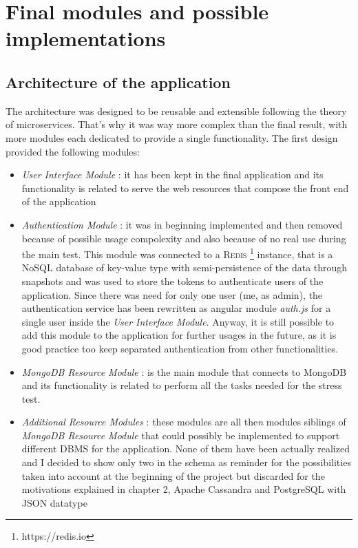 \section{Final modules and possible implementations}
\label{sec:5}

\subsection{Architecture of the application}
The architecture was designed to be reusable and extensible following the theory of microservices. That’s why it was way more complex than the final result, with more modules each dedicated to provide a single functionality. The first design provided the following modules:
\begin{itemize}
	\item \textit{User Interface Module} : it has been kept in the final application and its functionality is related to serve the web resources that compose the front end of the application
	\item \textit{Authentication Module} : it was in beginning implemented and then removed because of possible usage compolexity and also because of no real use during the main test. This module was connected to a \textsc{Redis} \footnote{https://redis.io} instance, that is a NoSQL database of key-value type with semi-persistence of the data through snapshots and was used to store the tokens to authenticate users of the application. Since there was need for only one user (me, as admin), the authentication service has been rewritten as angular module \textit{auth.js} for a single user inside the \textit{User Interface Module}. Anyway, it is still possible to add this module to the application for further usages in the future, as it is good practice too keep separated authentication from other functionalities.
	\item \textit{MongoDB Resource Module} : is the main module that connects to MongoDB and its functionality is related to perform all the tasks needed for the stress test.
	\item \textit{Additional Resource Modules} : these modules are all the\textit{n} modules siblings of \textit{MongoDB Resource Module} that could possibly be implemented to support different DBMS for the application. None of them have been actually realized and I decided to show only two in the schema as reminder for the possibilities taken into account at the beginning of the project but discarded for the motivations explained in chapter 2, Apache Cassandra and PostgreSQL with JSON datatype
\end{itemize}

